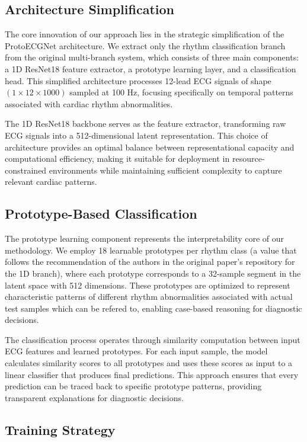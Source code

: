 \subsection{Architecture Simplification}

The core innovation of our approach lies in the strategic simplification of the ProtoECGNet architecture. We extract only the rhythm classification branch from the original multi-branch system, which consists of three main components: a 1D ResNet18 feature extractor, a prototype learning layer, and a classification head. This simplified architecture processes 12-lead ECG signals of shape $(1 \times 12 \times 1000)$ sampled at 100 Hz, focusing specifically on temporal patterns associated with cardiac rhythm abnormalities.

The 1D ResNet18 backbone serves as the feature extractor, transforming raw ECG signals into a 512-dimensional latent representation. This choice of architecture provides an optimal balance between representational capacity and computational efficiency, making it suitable for deployment in resource-constrained environments while maintaining sufficient complexity to capture relevant cardiac patterns.

\subsection{Prototype-Based Classification}

The prototype learning component represents the interpretability core of our methodology. We employ 18 learnable prototypes per rhythm class (a value that follows the recommendation of the authors in the original paper's repository for the 1D branch), where each prototype corresponds to a 32-sample segment in the latent space with 512 dimensions. These prototypes are optimized to represent characteristic patterns of different rhythm abnormalities associated with actual test samples which can be refered to, enabling case-based reasoning for diagnostic decisions.

The classification process operates through similarity computation between input ECG features and learned prototypes. For each input sample, the model calculates similarity scores to all prototypes and uses these scores as input to a linear classifier that produces final predictions. This approach ensures that every prediction can be traced back to specific prototype patterns, providing transparent explanations for diagnostic decisions.

\subsection{Training Strategy}

